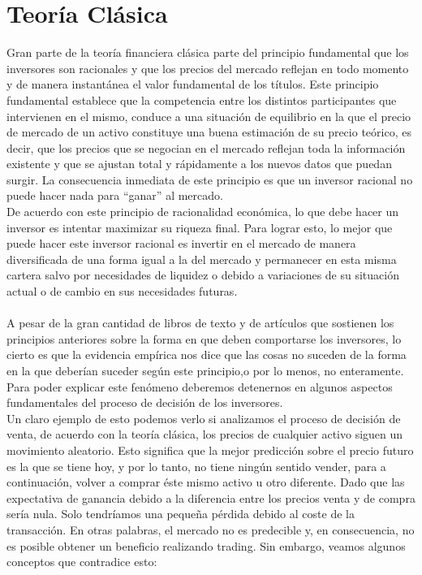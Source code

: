 \section{Teoría Clásica}

Gran parte de la teoría financiera clásica parte del principio fundamental que los inversores son racionales y que los precios del mercado reflejan en todo momento y de manera instantánea el valor fundamental de los títulos.
Este principio fundamental establece que la competencia entre los distintos participantes que intervienen en el mismo, conduce a una situación de equilibrio en la que el precio de mercado de un activo constituye una buena estimación de su precio teórico, es decir, que los precios que se negocian en el mercado reflejan toda la información existente y que se ajustan total y rápidamente a los nuevos datos que puedan surgir. La consecuencia inmediata de este principio es que un inversor racional no puede hacer nada para “ganar” al mercado.\\	

De acuerdo con este principio de racionalidad económica, lo que debe hacer un inversor es intentar maximizar su riqueza final. Para lograr esto, lo mejor que puede hacer este inversor racional es invertir en el mercado de manera diversificada de una forma igual a la del mercado y permanecer en esta misma cartera salvo por necesidades de liquidez o debido a variaciones de su situación actual o de cambio en sus necesidades futuras.
\\\\
A pesar de la gran cantidad de libros de texto y de artículos que sostienen los principios anteriores sobre la forma en que deben comportarse los inversores, lo cierto es que la evidencia empírica nos dice que las cosas no suceden de la forma en la que deberían suceder según este principio,o por lo menos, no enteramente.
Para poder explicar este fenómeno deberemos detenernos en algunos aspectos fundamentales del proceso de decisión de los inversores. 
\\
Un claro ejemplo de esto podemos verlo si analizamos el proceso de decisión de venta, de acuerdo con la teoría clásica, los precios de cualquier activo siguen un movimiento aleatorio. Esto significa que la mejor predicción sobre el precio futuro es la que se tiene hoy, y por lo tanto, no tiene ningún sentido vender, para a continuación, volver a comprar éste mismo activo u otro diferente. Dado que las expectativa de ganancia debido a la diferencia entre los precios venta y de compra sería nula. Solo tendríamos una pequeña pérdida debido al coste de la transacción.
En otras palabras, el mercado no es predecible y, en consecuencia, no es posible obtener un beneficio realizando trading. Sin embargo, veamos algunos conceptos que contradice esto:

